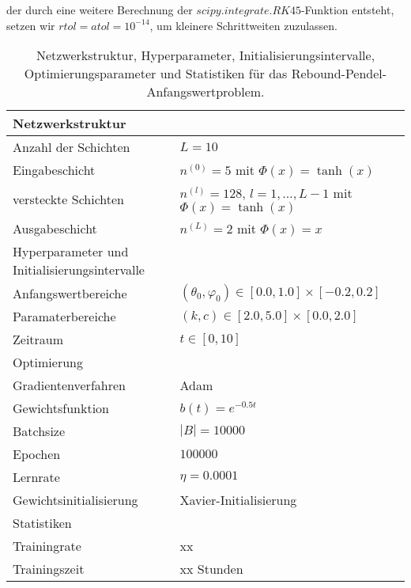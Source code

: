 der durch eine weitere Berechnung der $scipy.integrate.RK45$-Funktion entsteht, setzen wir $rtol=atol=10^{-14}$, um
kleinere Schrittweiten zuzulassen.
\begin{table}
       \renewcommand{\arraystretch}{1.0}
       \centering
       \begin{tabular}{ l | l }
              \hline
              Netzwerkstruktur & \\
              \hline
              Anzahl der Schichten & $L=10$ \\
              Eingabeschicht & $n^{(0)}=5$ mit $\Phi(x)=\tanh(x)$ \\
              versteckte Schichten & $n^{(l)}=128$, $l = 1, \dots, L-1$ mit $\Phi(x)=\tanh(x)$ \\
              Ausgabeschicht & $n^{(L)}=2$ mit $\Phi(x)=x$ \\
              \hline
              Hyperparameter und Initialisierungsintervalle & \\
              \hline
              Anfangswertbereiche & $(\theta_0, \varphi_0) \in [0.0, 1.0] \times [-0.2, 0.2]$ \\
              Paramaterbereiche & $(k, c) \in [2.0, 5.0] \times [0.0, 2.0]$ \\
              Zeitraum & $t \in [0, 10]$ \\
              \hline
              Optimierung & \\
              \hline
              Gradientenverfahren & Adam \\
              Gewichtsfunktion & $b(t)=e^{-0.5t}$ \\
              Batchsize & $|B|=10000$ \\
              Epochen & $100000$ \\
              Lernrate & $\eta= 0.0001$ \\
              Gewichtsinitialisierung & Xavier-Initialisierung \\
              \hline
              Statistiken & \\
              \hline
              Trainingrate & xx \\
              Trainingszeit & xx Stunden \\
              \hline
       \end{tabular}
       \caption{Netzwerkstruktur, Hyperparameter, Initialisierungsintervalle, Optimierungsparameter und Statistiken
       für das Rebound-Pendel-Anfangswertproblem.}
\label{rebound-pendulum-table}
\end{table}
